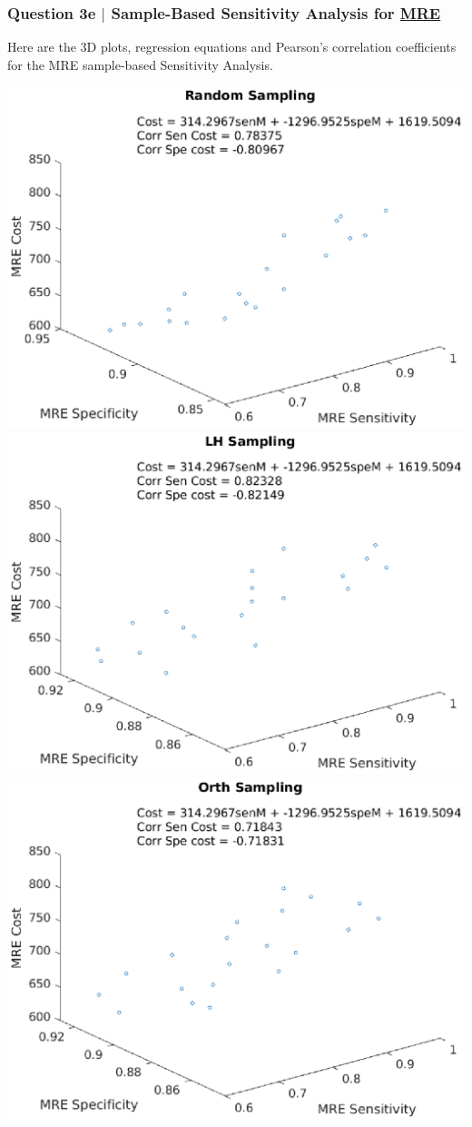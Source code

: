 \documentclass[aspectratio=1610]{beamer}
\begin{document}
\begin{frame}
\frametitle{Question 3e $|$ Sample-Based Sensitivity Analysis for \underline{MRE}}
Here are the 3D plots, regression equations and Pearson's correlation coefficients for the MRE sample-based Sensitivity Analysis. 

\vspace{1em}
\centering                                                         
\includegraphics[scale = .3]{mre1}
\includegraphics[scale = .3]{mre2}
\includegraphics[scale = .3]{mre3}\\

\end{frame}
\end{document}

